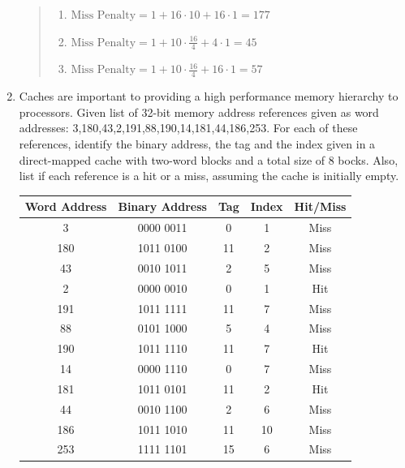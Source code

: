 \documentclass{article}
\begin{document}
\begin{enumerate}
\begin{center}
\end{center}
\begin{quote}
\begin{enumerate}
\item $\text{Miss Penalty} = 1 + 16 \cdot 10 + 16 \cdot 1 = 177$
\item $\text{Miss Penalty} = 1 + 10\cdot\frac{16}{4} + 4\cdot 1 = 45$
\item $\text{Miss Penalty} = 1 + 10\cdot\frac{16}{4} + 16\cdot 1 = 57$
\end{enumerate}
\end{quote}
\item Caches are important to providing a high performance memory hierarchy to processors. 
Given list of 32-bit memory address references given as word addresses: 3,180,43,2,191,88,190,14,181,44,186,253. 
For each of these references, identify the binary address, the tag and the index given in a direct-mapped 
cache with two-word blocks and a total size of 8 bocks. Also, list if each reference is a hit or a miss, 
assuming the cache is initially empty.
\begin{center}
\begin{tabular}{|c|c|c|c|c|}
\hline
Word Address & Binary Address & Tag & Index & Hit/Miss\\
\hline
3 & 0000 0011 & 0 & 1 & Miss\\
\hline
180 & 1011 0100 & 11 & 2 & Miss\\
\hline 
43 & 0010 1011 & 2 & 5 & Miss\\
\hline
2 & 0000 0010 & 0 & 1 & Hit\\
\hline
191 & 1011 1111 & 11 & 7 & Miss\\
\hline
88 & 0101 1000 & 5 & 4 & Miss\\ 
\hline
190 & 1011 1110 & 11 & 7 & Hit\\
\hline
14 & 0000 1110 & 0 & 7 & Miss\\
\hline
181 & 1011 0101 & 11 & 2 & Hit\\
\hline
44 & 0010 1100 & 2 & 6 & Miss\\
\hline
186 & 1011 1010 & 11 & 10 & Miss\\
\hline
253 & 1111 1101 & 15 & 6 & Miss\\
\hline
\end{tabular}
\end{center}
\end{enumerate}
\end{document}
